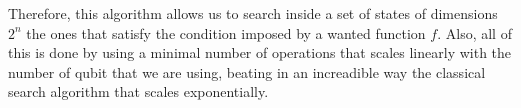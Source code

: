 \noindent
Therefore, this algorithm allows us to search inside a set of states of dimensions $2^n$ the ones that satisfy the condition imposed by a wanted function $f$. Also, all of this is done by using a minimal number of operations that scales linearly with the number of qubit that we are using, beating in an increadible way the classical search algorithm that scales exponentially.
